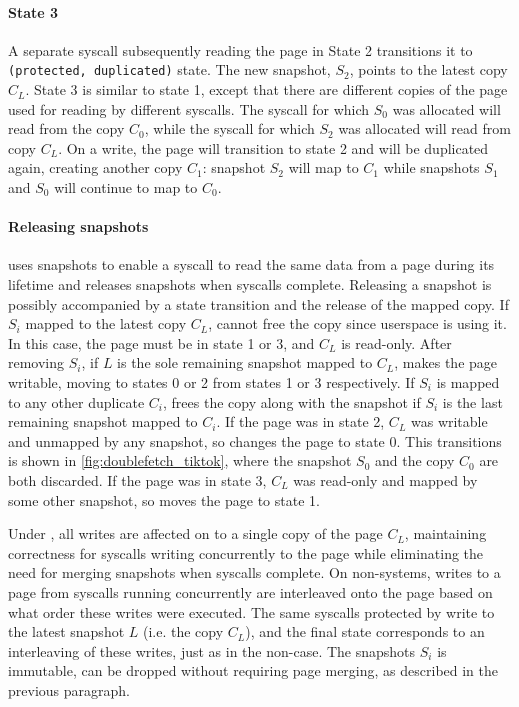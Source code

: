 \documentclass[letterpaper,twocolumn,10pt, anonymous]{article}
\begin{document}
\paragraph{State 3}
A separate syscall subsequently reading the page in State 2 transitions 
it to \texttt{(protected, duplicated)} state. 
The new snapshot, $S_2$, points to the latest copy $C_L$.
State 3 is similar to state 1, except that there are different copies of 
the page used for reading by different syscalls. 
The syscall for which $S_0$ was allocated will read from the copy $C_0$,
while the syscall for which $S_2$ was allocated will read from copy $C_L$.
On a write, the page will transition to state 2 and will be duplicated again,
creating another copy $C_1$: snapshot $S_2$ will map to $C_1$ while 
snapshots $S_1$ and $S_0$ will continue to map to $C_0$. 

\paragraph{Releasing snapshots}
\tiktok uses snapshots to enable a syscall to read the same data from a page 
during its lifetime and releases snapshots when syscalls complete. 
Releasing a snapshot is possibly accompanied by a state transition
and the release of the mapped copy.
If $S_i$ mapped to the latest copy $C_L$, \tiktok cannot free the copy
since userspace is using it.
In this case, the page must be in state 1 or 3, and $C_L$ is read-only.
After removing $S_i$, if $L$ is the sole remaining snapshot mapped to $C_L$, 
\tiktok makes the page writable, moving to states 0 or 2 from states 
1 or 3 respectively. 
If $S_i$ is mapped to any other duplicate $C_i$, \tiktok frees the copy along
with the snapshot if $S_i$ is the last remaining snapshot mapped to $C_i$.
If the page was in state 2, $C_L$ was writable and unmapped by any snapshot,
so \tiktok changes the page to state 0.
This transitions is shown in \autoref{fig:doublefetch_tiktok}, where the 
snapshot $S_0$ and the copy $C_0$ are both discarded.
If the page was in state 3, $C_L$ was read-only and mapped by some other
snapshot, so \tiktok moves the page to state 1.

Under \tiktok, all writes are affected on to a single copy of the page $C_L$,
maintaining correctness for syscalls writing concurrently to the page while
eliminating the need for merging snapshots when syscalls complete.
On non-\tiktok systems, writes to a page from syscalls running concurrently
are interleaved onto the page based on what order these writes were 
executed. 
The same syscalls protected by \tiktok write to the latest snapshot $L$ (i.e. 
the copy $C_L$), and the final state corresponds to an interleaving of these
writes, just as in the non-\tiktok case.
The snapshots $S_i$ is immutable, can be dropped without requiring page 
merging, as described in the previous paragraph.
\end{document}
